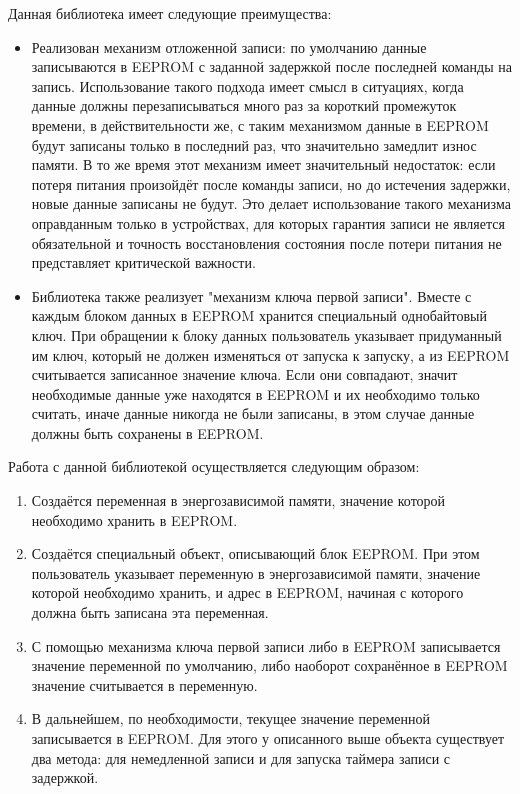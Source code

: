 Данная библиотека имеет следующие преимущества:
\begin{itemize}
	\item Реализован механизм отложенной записи: по умолчанию данные записываются в EEPROM с заданной задержкой после последней команды на запись. Использование такого подхода имеет смысл в ситуациях, когда данные должны перезаписываться много раз за короткий промежуток времени, в действительности же, с таким механизмом данные в EEPROM будут записаны только в последний раз, что значительно замедлит износ памяти. В то же время этот механизм имеет значительный недостаток: если потеря питания произойдёт после команды записи, но до истечения задержки, новые данные записаны не будут. Это делает использование такого механизма оправданным только в устройствах, для которых гарантия записи не является обязательной и точность восстановления состояния после потери питания не представляет критической важности.
	\item Библиотека также реализует "механизм ключа первой записи". Вместе с каждым блоком данных в EEPROM хранится специальный однобайтовый ключ. При обращении к блоку данных пользователь указывает придуманный им ключ, который не должен изменяться от запуска к запуску, а из EEPROM считывается записанное значение ключа. Если они совпадают, значит необходимые данные уже находятся в EEPROM и их необходимо только считать, иначе данные никогда не были записаны, в этом случае данные должны быть сохранены в EEPROM.
\end{itemize}

Работа с данной библиотекой осуществляется следующим образом:
\begin{enumerate}
	\item Создаётся переменная в энергозависимой памяти, значение которой необходимо хранить в EEPROM.
	\item Создаётся специальный объект, описывающий блок EEPROM. При этом пользователь указывает переменную в энергозависимой памяти, значение которой  необходимо хранить, и адрес в EEPROM, начиная с которого должна быть записана эта переменная.
	\item С помощью механизма ключа первой записи либо в EEPROM записывается значение переменной по умолчанию, либо наоборот сохранённое в EEPROM значение считывается в переменную.
	\item В дальнейшем, по необходимости, текущее значение переменной записывается в EEPROM. Для этого у описанного выше объекта существует два метода: для немедленной записи и для запуска таймера записи с задержкой.
\end{enumerate}

